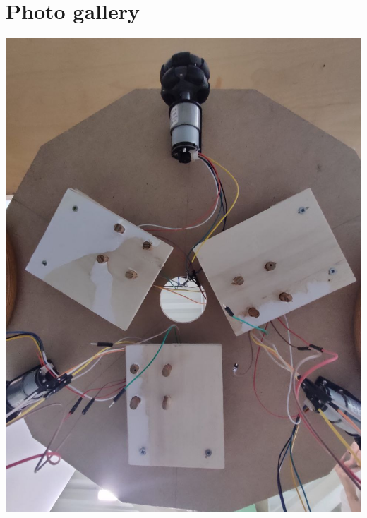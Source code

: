 \documentclass{article}
\begin{document}
\section{Photo gallery}
\noindent
\begin{minipage}[t]{0.5\textwidth}
  \vspace{0pt}
  \includegraphics[width=0.9\linewidth]{photos/1.jpg}
  \vspace{0pt}

\end{minipage}
\end{document}
